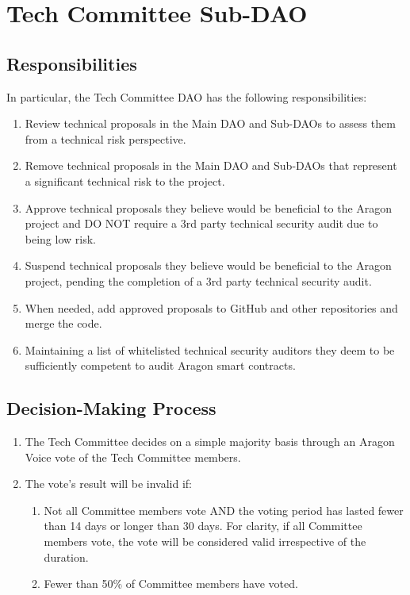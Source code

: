 \section{Tech Committee Sub-DAO}

\subsection{Responsibilities}		

In particular, the Tech Committee \ac{DAO} has the following responsibilities:
\begin{enumerate}		
	\item Review technical proposals in the Main \ac{DAO} and Sub-\acp{DAO} to assess them from a technical risk perspective.
	\item Remove technical proposals in the Main \ac{DAO} and Sub-\acp{DAO} that represent a significant technical risk to the project.
	\item Approve technical proposals they believe would be beneficial to the Aragon project and DO NOT require a 3rd party technical security audit due to being low risk.
	\item Suspend technical proposals they believe would be beneficial to the Aragon project, pending the completion of a 3rd party technical security audit.
	\item When needed, add approved proposals to GitHub and other repositories and merge the code.
	\item Maintaining a list of whitelisted technical security auditors they deem to be sufficiently competent to audit Aragon smart contracts.
\end{enumerate}



\subsection{Decision-Making Process}

\begin{enumerate}
	\item The Tech Committee decides on a simple majority basis through an Aragon Voice vote of the Tech Committee members.
	\item The vote’s result will be invalid if:
	\begin{enumerate}
		\item Not all Committee members vote AND the voting period has lasted
		fewer than 14 days or longer than 30 days.
		For clarity, if all Committee members vote, the vote will be considered valid irrespective of the duration.
		\item Fewer than 50\% of Committee members have voted.
	\end{enumerate}
\end{enumerate}


